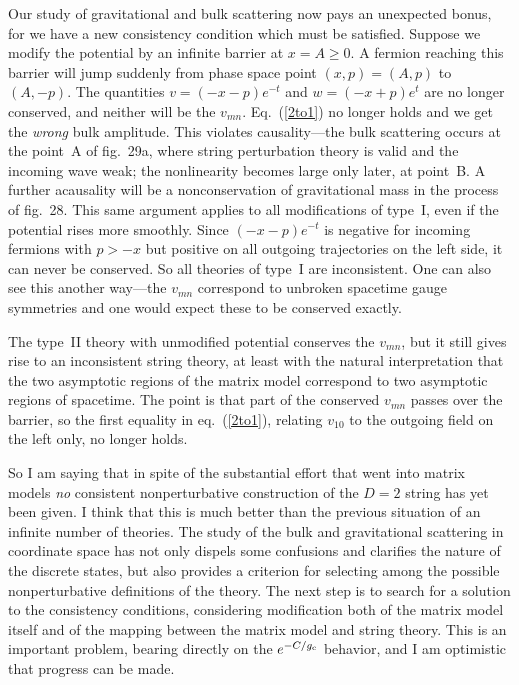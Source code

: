 Our study of gravitational and bulk scattering now pays an
unexpected bonus, for we have a new consistency condition which
must be satisfied.  Suppose we modify the potential by an
infinite barrier at $x = A \geq 0$.  A fermion reaching this
barrier will jump suddenly from phase space point $(x,p) =
(A,p)$ to $(A, -p)$.  The quantities $v = (-x-p) e^{-t}$ and $w
= (-x+p) e^t$ are no longer conserved, and neither will be the
$v_{mn}$.  Eq.~(\ref{2to1}) no longer holds and we get
the {\it wrong} bulk amplitude.  This
violates causality---the bulk scattering occurs at the point~A
of fig.~29a, where string perturbation theory is valid and the
incoming wave weak; the nonlinearity becomes large only later,
at point~B\@.  A further acausality will be a
nonconservation of gravitational mass in the process of
fig.~28. 
This same argument applies to all modifications of type~I,
even if
the potential rises more smoothly.  Since
$(-x-p) e^{-t}$ is negative for incoming fermions with $p > - x$
but positive on all outgoing trajectories on the left side, it can
never be conserved.  So all theories of type~I are inconsistent.
One can also see this another way---the $v_{mn}$
correspond to unbroken spacetime gauge symmetries and one would expect
these to be conserved exactly.

The type~II theory with unmodified potential conserves the
$v_{mn}$, but it still gives rise to an inconsistent string
theory, at least with the natural interpretation that the two
asymptotic regions of the matrix model correspond to two
asymptotic regions of spacetime.  The point is that part of the
conserved $v_{mn}$ passes over the barrier, so the first equality
in eq.~(\ref{2to1}), relating $v_{10}$ to the outgoing field on
the left only, no longer holds.

So I am saying that in spite of the substantial effort that went
into matrix models {\it no} consistent nonperturbative
construction of the $D=2$ string has yet been given.  I think that
this is much better than the previous situation of an infinite
number of theories.  The study of the bulk and gravitational
scattering in coordinate space has not only dispels some
confusions and clarifies the nature of the discrete states, but
also provides a criterion for selecting among the possible
nonperturbative definitions of the theory.  The next step is to
search for a solution to the consistency conditions, considering
modification both of the matrix model itself and of the mapping
between the matrix model and string theory.  This is an important
problem, bearing directly on the $e^{-C/g_{\rm c}}$ behavior, and I
am optimistic that progress can be made.

